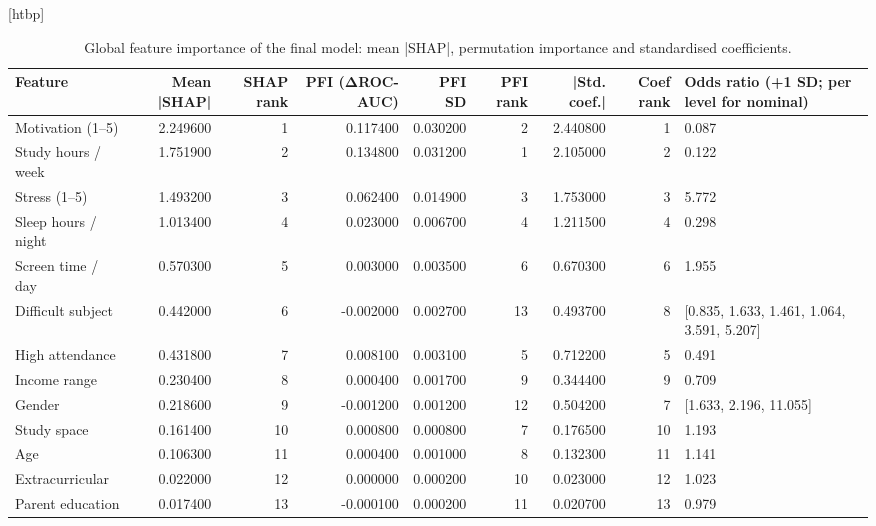 \begin{table}
\small[htbp]
\caption{Global feature importance of the final model: mean |SHAP|, permutation importance and standardised coefficients.}
\label{tab:S06_global_importance}
\begin{tabular}{lrrrrrrrl}
\toprule
Feature & Mean |SHAP| & SHAP rank & PFI (ΔROC-AUC) & PFI SD & PFI rank & |Std. coef.| & Coef rank & Odds ratio (+1 SD; per level for nominal) \\
\midrule
Motivation (1–5) & 2.249600 & 1 & 0.117400 & 0.030200 & 2 & 2.440800 & 1 & 0.087 \\
Study hours / week & 1.751900 & 2 & 0.134800 & 0.031200 & 1 & 2.105000 & 2 & 0.122 \\
Stress (1–5) & 1.493200 & 3 & 0.062400 & 0.014900 & 3 & 1.753000 & 3 & 5.772 \\
Sleep hours / night & 1.013400 & 4 & 0.023000 & 0.006700 & 4 & 1.211500 & 4 & 0.298 \\
Screen time / day & 0.570300 & 5 & 0.003000 & 0.003500 & 6 & 0.670300 & 6 & 1.955 \\
Difficult subject & 0.442000 & 6 & -0.002000 & 0.002700 & 13 & 0.493700 & 8 & [0.835, 1.633, 1.461, 1.064, 3.591, 5.207] \\
High attendance & 0.431800 & 7 & 0.008100 & 0.003100 & 5 & 0.712200 & 5 & 0.491 \\
Income range & 0.230400 & 8 & 0.000400 & 0.001700 & 9 & 0.344400 & 9 & 0.709 \\
Gender & 0.218600 & 9 & -0.001200 & 0.001200 & 12 & 0.504200 & 7 & [1.633, 2.196, 11.055] \\
Study space & 0.161400 & 10 & 0.000800 & 0.000800 & 7 & 0.176500 & 10 & 1.193 \\
Age & 0.106300 & 11 & 0.000400 & 0.001000 & 8 & 0.132300 & 11 & 1.141 \\
Extracurricular & 0.022000 & 12 & 0.000000 & 0.000200 & 10 & 0.023000 & 12 & 1.023 \\
Parent education & 0.017400 & 13 & -0.000100 & 0.000200 & 11 & 0.020700 & 13 & 0.979 \\
\bottomrule
\end{tabular}
\end{table}
